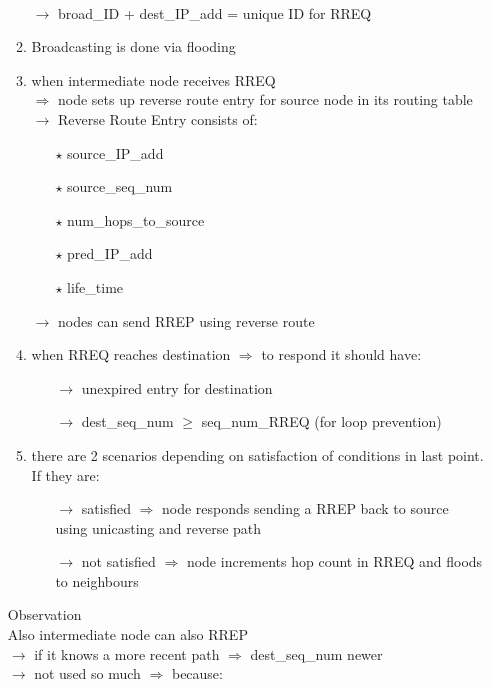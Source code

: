 \begin{itemize}
\begin{enumerate}
        \\$\rightarrow$ broad\_ID + dest\_IP\_add = unique ID for RREQ
        \item Broadcasting is done via flooding
        \item when intermediate node receives RREQ\\$\Rightarrow$ node sets up
        reverse route entry for source node in its routing table\\
        $\rightarrow$ Reverse Route Entry consists of:
        \begin{itemize}
            \item[$\star$] source\_IP\_add
            \item[$\star$] source\_seq\_num
            \item[$\star$] num\_hops\_to\_source
            \item[$\star$] pred\_IP\_add
            \item[$\star$] life\_time
        \end{itemize}
        $\rightarrow$ nodes can send RREP using reverse route
        \item when RREQ reaches destination $\Rightarrow$ to respond it should have:
        \begin{itemize}
            \item[$\rightarrow$] unexpired entry for destination
            \item[$\rightarrow$] dest\_seq\_num $\geq$ seq\_num\_RREQ (for loop prevention)
        \end{itemize}
        \item there are 2 scenarios depending on satisfaction of conditions in last point. If they are:
        \begin{itemize}
            \item[$\rightarrow$] satisfied $\Rightarrow$ node responds sending a RREP back to source\\
            using unicasting and reverse path
            \item[$\rightarrow$] not satisfied $\Rightarrow$ node increments hop count in RREQ and floods to neighbours
        \end{itemize}
    \end{enumerate}
    Observation\\[0.05cm]
    Also intermediate node can also RREP\\[0.05cm]
    $\rightarrow$ if it knows a more recent path $\Rightarrow$ dest\_seq\_num newer
    \\$\rightarrow$ not used so much $\Rightarrow$ because:

\end{itemize}
